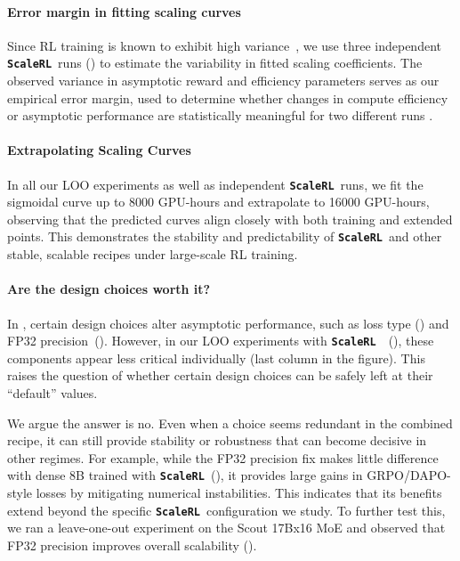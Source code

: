 \documentclass[]{fairmeta} %
\newcommand{\scalerl}{\texttt{\textbf{ScaleRL}}}
\begin{document}
\paragraph{Error margin in fitting scaling curves} Since RL training is known to exhibit high variance~\citep{agarwal2021deep}, we use three independent \scalerl\ runs () to estimate the variability in fitted scaling coefficients. The observed variance in asymptotic reward and efficiency parameters serves as our empirical error margin, used to determine whether changes in compute efficiency or asymptotic performance are statistically meaningful for two different runs \citep{quantvar}.

\paragraph{Extrapolating Scaling Curves}
In all our LOO experiments as well as independent \scalerl\ runs, we fit the sigmoidal curve up to 8000 GPU-hours and extrapolate to 16000 GPU-hours, observing that the predicted curves align closely with both training and extended points. This demonstrates the stability and predictability of \scalerl\ and other stable, scalable recipes under large-scale RL training.

\paragraph{Are the design choices worth it?}
In , certain design choices alter asymptotic performance, such as loss type () and FP32 precision~(). However, in our LOO experiments with \scalerl\ ~(), these components appear less critical individually (last column in the figure). 
This raises the question of whether certain design choices can be safely left at their ``default'' values. 

We argue the answer is no. Even when a choice seems redundant in the combined recipe, it can still provide stability or robustness that can become decisive in other regimes. 
For example, while the FP32 precision fix makes little difference with dense 8B trained with \scalerl\ (), it provides large gains in GRPO/DAPO-style losses by mitigating numerical instabilities. This indicates that its benefits extend beyond the specific \scalerl\ configuration we study. To further test this, we ran a leave-one-out experiment on the Scout 17Bx16 MoE and observed that FP32 precision improves overall scalability (). 
\end{document}
